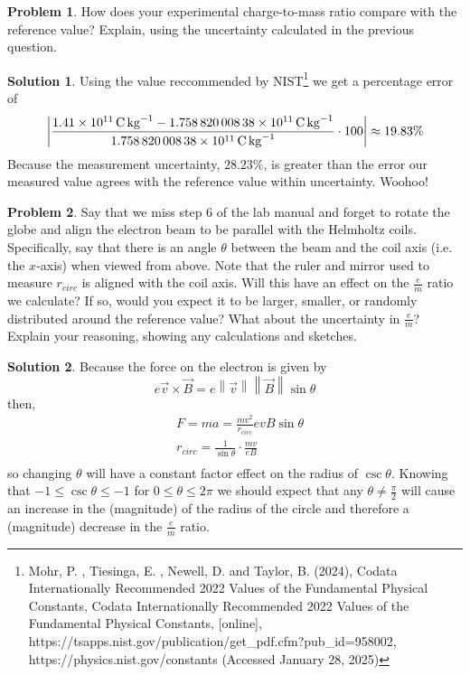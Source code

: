 \documentclass[10pt]{article}
\theoremstyle{definition}
\newtheorem{problem}{Problem}
\newtheorem{soln}{Solution}
\begin{document}
\begin{problem}
How does your experimental charge-to-mass ratio compare with the reference value? Explain, using the uncertainty calculated in the previous question.
\end{problem}
\begin{soln}
  Using the value reccommended by NIST\footnote{Mohr, P. , Tiesinga, E. , Newell, D. and Taylor, B. (2024), Codata Internationally Recommended 2022 Values of the Fundamental Physical Constants, Codata Internationally Recommended 2022 Values of the Fundamental Physical Constants, [online], https://tsapps.nist.gov/publication/get\_pdf.cfm?pub\_id=958002, https://physics.nist.gov/constants (Accessed January 28, 2025) }
  we get a percentage error of
  $$\left\lvert \frac{\qty{1.41d11}{\coulomb\per\kilo\gram}-\qty{1.758 820 008 38d11}{\coulomb\per\kilo\gram}}{\qty{1.758 820 008 38d11}{\coulomb\per\kilo\gram}}\cdot100\right\rvert\approx 19.83\%$$
  Because the measurement uncertainty, $28.23\%$, is greater than the error our measured value agrees with the reference value within uncertainty. Woohoo!
\end{soln}

\begin{problem}
Say that we miss step 6 of the lab manual and forget to rotate the globe and align the electron beam to be parallel with the Helmholtz coils.
Specifically, say that there is an angle $\theta$ between the beam and the coil axis (i.e. the $x$-axis) when viewed from above.
Note that the ruler and mirror used to measure $r_{circ}$ is aligned with the coil axis. Will this have an effect on the $\frac{e}{m}$ ratio we calculate?
If so, would you expect it to be larger, smaller, or randomly distributed around the reference value? What about the uncertainty in $\frac{e}{m}$?
Explain your reasoning, showing any calculations and sketches.
\end{problem}
\begin{soln}
  Because the force on the electron is given by
  $$e\vec{v}\times \vec{B}=e\left\lVert \vec{v}\right\rVert\left\lVert \vec{B}\right\rVert\sin\theta$$
  then,
  \begin{align*}
     & F=ma=\frac{mv^2}{r_{circ}}evB\sin\theta         \\
     & r_{circ}=\frac{1}{\sin\theta}\cdot\frac{mv}{eB} \\
  \end{align*}
  so changing $\theta$ will have a constant factor effect on the radius of $\csc\theta$. Knowing that $-1\leq\csc\theta\leq-1$ for $0\leq\theta\leq2\pi$
  we should expect that any $\theta\neq\frac{\pi}{2}$ will cause an increase in the (magnitude) of the radius of the circle and therefore a (magnitude) decrease in the $\frac{e}{m}$ ratio.
\end{soln}
\end{document}
